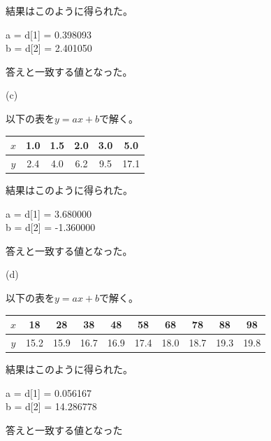 \documentclass[a4paper,11pt,dvipdfmx]{jsarticle}
\begin{document}
結果はこのように得られた。

\begin{shaded}
    \noindent
    \centering
    a = d[1] = 0.398093\\
    b = d[2] = 2.401050
\end{shaded}

答えと一致する値となった。

(c) 

以下の表を$y=ax+b$で解く。
\begin{center}
    \begin{tabular}[h]{|c|c|c|c|c|c|} \hline
         $x$  & 1.0 & 1.5 & 2.0 & 3.0 &  5.0 \\ \hline
         $y$  & 2.4 & 4.0 & 6.2 & 9.5 & 17.1 \\ \hline
    \end{tabular}
\end{center}

結果はこのように得られた。

\begin{shaded}
    \noindent
    \centering
    a = d[1] = 3.680000\\
    b = d[2] = -1.360000
\end{shaded}

答えと一致する値となった。

(d) 

以下の表を$y=ax+b$で解く。
\begin{center}
    \begin{tabular}[h]{|c|c|c|c|c|c|c|c|c|c|} \hline
         $x$  & 18 & 28 & 38 & 48 & 58 & 68 & 78 & 88 & 98 \\ \hline
         $y$  & 15.2 & 15.9 & 16.7 & 16.9 & 17.4 & 18.0 & 18.7 & 19.3 & 19.8 \\ \hline
    \end{tabular}
\end{center}

結果はこのように得られた。

\begin{shaded}
    \noindent
    \centering
    a = d[1] = 0.056167\\
    b = d[2] = 14.286778
\end{shaded}

答えと一致する値となった
\end{document}
